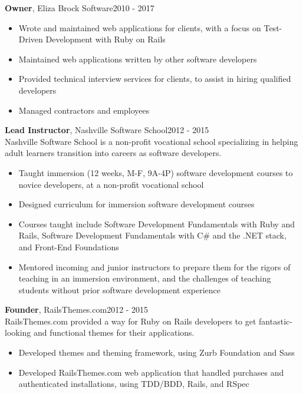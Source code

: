 \documentclass[line, margin, 10pt]{res}
\begin{document}
\begin{resume}
{\bf Owner}, Eliza Brock Software\hfill 2010 - 2017
\begin{itemize} \itemsep -2pt  %
  \item Wrote and maintained web applications for clients, with a focus on Test-Driven \mbox{Development} with Ruby on Rails
  \item Maintained web applications written by other software developers
  \item Provided technical interview services for clients, to assist in hiring qualified developers
  \item Managed contractors and employees
\end{itemize}

{\bf Lead Instructor}, Nashville Software School\hfill 2012 - 2015\\
Nashville Software School is a non-profit vocational school specializing in helping adult learners transition into careers as software developers.
\begin{itemize} \itemsep -2pt  %
  \item Taught immersion (12 weeks, M-F, 9A-4P) software development courses to novice developers, at a non-profit vocational school
  \item Designed curriculum for immersion software development courses
  \item Courses taught include Software Development Fundamentals with Ruby and Rails, Software Development Fundamentals with C\# and the .NET stack, and Front-End Foundations
  \item Mentored incoming and junior instructors to prepare them for the rigors of teaching in an immersion environment, and the challenges of teaching students without prior software development experience
\end{itemize}

{\bf Founder}, RailsThemes.com\hfill 2012 - 2015\\
RailsThemes.com provided a way for Ruby on Rails developers to get fantastic-looking and functional themes for their applications.
\begin{itemize} \itemsep -2pt  %
    \item Developed themes and theming framework, using Zurb Foundation and Sass
    \item Developed RailsThemes.com web application that handled purchases and authenticated installations, using TDD/BDD, Rails, and RSpec
\end{itemize}


\end{resume}
\end{document}
